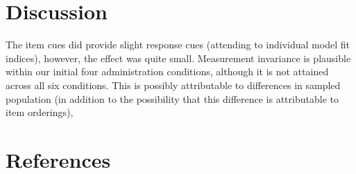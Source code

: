\documentclass[
  man]{apa6}
\begin{document}
\hypertarget{discussion}{%
\section{Discussion}\label{discussion}}

The item cues did provide slight response cues (attending to individual model fit indices), however, the effect was quite small. Measurement invariance is plausible within our initial four administration conditions, although it is not attained across all six conditions. This is possibly attributable to differences in sampled population (in addition to the possibility that this difference is attributable to item orderings),

\newpage

\hypertarget{references}{%
\section{References}\label{references}}

\begingroup
\setlength{\parindent}{-0.5in}
\setlength{\leftskip}{0.5in}
\end{document}
